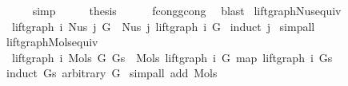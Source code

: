 \begin{isabellebody}
\ \ \ \ \isamarkupfalse%
\ simp\isanewline
\ \ \isamarkupfalse%
\ \isamarkupfalse%
\ {\isacharquery}{\kern0pt}thesis\isanewline
\ \ \ \ \isamarkupfalse%
\ f{\isacharunderscore}{\kern0pt}cong{\isacharunderscore}{\kern0pt}gcong\ \isamarkupfalse%
\ blast\isanewline
{}\isamarkupfalse%
%
\endisatagproof
{\isafoldproof}%
%
\isadelimproof
%
\endisadelimproof
%
\isadelimdocument
%
\endisadelimdocument
%
\isatagdocument
%
\isamarkuptrue%
%
\endisatagdocument
{\isafolddocument}%
%
\isadelimdocument
%
\endisadelimdocument
{}\isamarkupfalse%
\ lift{\isacharunderscore}{\kern0pt}graph{\isacharunderscore}{\kern0pt}Nus{}{\isacharunderscore}{\kern0pt}equiv{\isacharcolon}{\kern0pt}\isanewline
\ \ {\isachardoublequoteopen}lift{\isacharunderscore}{\kern0pt}graph\ i\ {\isacharparenleft}{\kern0pt}Nus{}\ j\ G{\isacharparenright}{\kern0pt}\ {\isacharequal}{\kern0pt}\ Nus{}\ j\ {\isacharparenleft}{\kern0pt}lift{\isacharunderscore}{\kern0pt}graph\ i\ G{\isacharparenright}{\kern0pt}{\isachardoublequoteclose}\isanewline
%
\isadelimproof
%
\endisadelimproof
%
\isatagproof
{}\isamarkupfalse%
\ {\isacharparenleft}{\kern0pt}induct\ j{\isacharparenright}{\kern0pt}\isanewline
{}\isamarkupfalse%
\ simp{\isacharunderscore}{\kern0pt}all%
\endisatagproof
{\isafoldproof}%
%
\isadelimproof
\isanewline
%
\endisadelimproof
\isanewline
\isanewline
{}\isamarkupfalse%
\ lift{\isacharunderscore}{\kern0pt}graph{\isacharunderscore}{\kern0pt}Mols{}{\isacharunderscore}{\kern0pt}equiv{\isacharcolon}{\kern0pt}\isanewline
\ \ {\isachardoublequoteopen}lift{\isacharunderscore}{\kern0pt}graph\ i\ {\isacharparenleft}{\kern0pt}Mols{}\ G\ Gs{\isacharparenright}{\kern0pt}\ {\isacharequal}{\kern0pt}\ Mols{}\ {\isacharparenleft}{\kern0pt}lift{\isacharunderscore}{\kern0pt}graph\ i\ G{\isacharparenright}{\kern0pt}\ {\isacharparenleft}{\kern0pt}map\ {\isacharparenleft}{\kern0pt}lift{\isacharunderscore}{\kern0pt}graph\ i{\isacharparenright}{\kern0pt}\ Gs{\isacharparenright}{\kern0pt}{\isachardoublequoteclose}\isanewline
%
\isadelimproof
%
\endisadelimproof
%
\isatagproof
{}\isamarkupfalse%
\ {\isacharparenleft}{\kern0pt}induct\ Gs\ arbitrary{\isacharcolon}{\kern0pt}\ G{\isacharparenright}{\kern0pt}\isanewline
{}\isamarkupfalse%
\ {\isacharparenleft}{\kern0pt}simp{\isacharunderscore}{\kern0pt}all\ add{\isacharcolon}{\kern0pt}\ Mols{}{\isacharparenright}{\kern0pt}%

\end{isabellebody}
